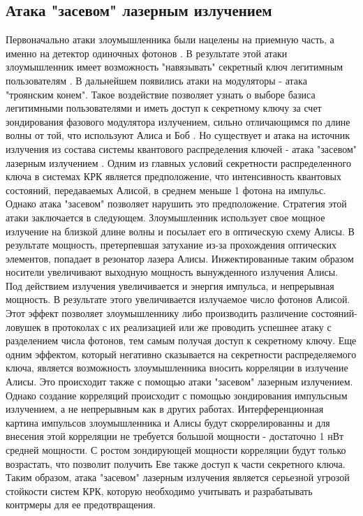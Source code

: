 \subsection{Атака "засевом" лазерным излучением}\label{sec:ch1/sect7/subsec1}
Первоначально атаки злоумышленника были нацелены на приемную часть, а именно на детектор одиночных фотонов \cite{makarov2009, sajeed2020, chistiakov2019, qian2018}. В результате этой атаки злоумышленник имеет возможность "навязывать" секретный ключ легитимным пользователям \cite{lydersen2010}. 
В дальнейшем  появились атаки на модуляторы - атака "троянским конем". Такое воздействие позволяет узнать о выборе базиса легитимными пользователями и иметь доступ к секретному ключу за счет зондирования фазового модулятора излучением, сильно отличающимся по длине волны от той, что используют Алиса и Боб \cite{jain2014,a-etsi2021,gisin2006}.
Но существует и атака на источник излучения из состава системы квантового распределения ключей - атака "засевом" лазерным излучением \cite{huang2019,lovic2023}. Одним из главных условий секретности распределенного ключа в системах КРК является предположение, что интенсивность квантовых состояний, передаваемых Алисой, в среднем меньше 1 фотона на импульс.
Однако атака "засевом" позволяет нарушить это предположение. Стратегия этой атаки заключается в следующем. Злоумышленник использует свое мощное излучение на близкой длине волны и посылает его в оптическую схему Алисы.
В результате мощность, претерпевшая затухание из-за прохождения оптических элементов, попадает в резонатор лазера Алисы. Инжектированные таким образом носители увеличивают выходную мощность вынужденного излучения Алисы. 
Под действием излучения увеличивается и энергия импульса, и непрерывная мощность. В результате этого увеличивается излучаемое число фотонов Алисой. Этот эффект позволяет злоумышленнику либо производить различение состояний-ловушек в протоколах с их реализацией или же проводить успешнее атаку с разделением числа фотонов, тем самым получая доступ к секретному ключу. 
Еще одним эффектом, который негативно сказывается на секретности распределяемого ключа, является возможность злоумышленника вносить корреляции в излучение Алисы. Это происходит также с помощью атаки "засевом" лазерным излучением.
Однако создание корреляций происходит с помощью зондирования импульсным излучением, а не непрерывным как в других работах. Интерференционная картина импульсов злоумышленника и Алисы будут скоррелированны и для внесения этой корреляции не требуется большой мощности - достаточно 1 нВт средней мощности. 
С ростом зондирующей мощности корреляции будут только возрастать, что позволит получить Еве также доступ к части секретного ключа.
\newline Таким образом, атака "засевом" лазерным излучения является серьезной угрозой стойкости систем КРК, которую необходимо учитывать и разрабатывать контрмеры для ее предотвращения. 

